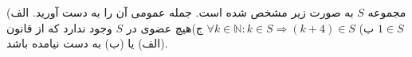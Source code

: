 \begin{problem}
    \p
مجموعه
$S$
به صورت زیر مشخص شده است. جمله عمومی آن را به دست آورید.
	\p
الف)
$1 \in S$
	\p
ب)
$\forall k \in \mathbb{N} : k \in S \Rightarrow (k + 4) \in S$
	\p
ج)هیچ عضوی در
$S$
وجود ندارد که از قانون (الف) یا (ب) به دست نیامده باشد.
\end{problem}